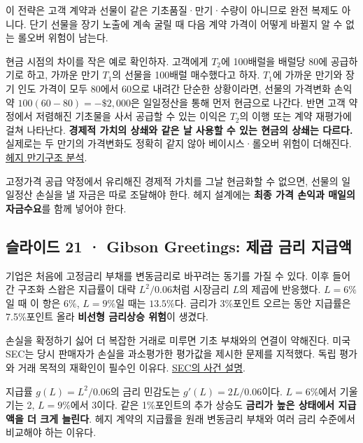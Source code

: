 \documentclass[11pt,a4paper]{article}
\begin{document}
이 전략은 고객 계약과 선물이 같은 기초품질·만기·수량이 아니므로 완전 복제도 아니다. 단기 선물을 장기 노출에 계속 굴릴 때 다음 계약 가격이 어떻게 바뀔지 알 수 없는 롤오버 위험이 남는다.\par

현금 시점의 차이를 작은 예로 확인하자. 고객에게 $T_2$에 100배럴을 배럴당 $80$에 공급하기로 하고, 가까운 만기 $T_1$의 선물을 100배럴 매수했다고 하자. $T_1$에 가까운 만기와 장기 인도 가격이 모두 $80$에서 $60$으로 내려간 단순한 상황이라면, 선물의 가격변화 손익 약 $100(60-80)=-\$2{,}000$은 일일정산을 통해 먼저 현금으로 나간다. 반면 고객 약정에서 저렴해진 기초물을 사서 공급할 수 있는 이익은 $T_2$의 이행 또는 계약 재평가에 걸쳐 나타난다. \textbf{경제적 가치의 상쇄와 같은 날 사용할 수 있는 현금의 상쇄는 다르다.} 실제로는 두 만기의 가격변화도 정확히 같지 않아 베이시스·롤오버 위험이 더해진다. \href{https://papers.ssrn.com/sol3/papers.cfm?abstract_id=6104}{헤지 만기구조 분석}.\par

고정가격 공급 약정에서 유리해진 경제적 가치를 그날 현금화할 수 없으면, 선물의 일일정산 손실을 낼 자금은 따로 조달해야 한다. 헤지 설계에는 \textbf{최종 가격 손익과 매일의 자금수요}를 함께 넣어야 한다.\par

\subsection{슬라이드 21 · Gibson Greetings: 제곱 금리 지급액}
기업은 처음에 고정금리 부채를 변동금리로 바꾸려는 동기를 가질 수 있다. 이후 들어간 구조화 스왑은 지급률이 대략 $L^2/0.06$처럼 시장금리 $L$의 제곱에 반응했다. $L=6\%$일 때 이 항은 $6\%$, $L=9\%$일 때는 $13.5\%$다. 금리가 3\%포인트 오르는 동안 지급률은 7.5\%포인트 올라 \textbf{비선형 금리상승 위험}이 생겼다.\par

손실을 확정하기 싫어 더 복잡한 거래로 미루면 기초 부채와의 연결이 약해진다. 미국 SEC는 당시 판매자가 손실을 과소평가한 평가값을 제시한 문제를 지적했다. 독립 평가와 거래 목적의 재확인이 필수인 이유다. \href{https://www.sec.gov/newsroom/speeches-statements/tsty1598-testimony-otc-derivatives-us-financial-markets}{SEC의 사건 설명}.\par

지급률 $g(L)=L^2/0.06$의 금리 민감도는 $g'(L)=2L/0.06$이다. $L=6\%$에서 기울기는 2, $L=9\%$에서 3이다. 같은 1\%포인트의 추가 상승도 \textbf{금리가 높은 상태에서 지급액을 더 크게 늘린다}. 헤지 계약의 지급률을 원래 변동금리 부채와 여러 금리 수준에서 비교해야 하는 이유다.\par
\end{document}
